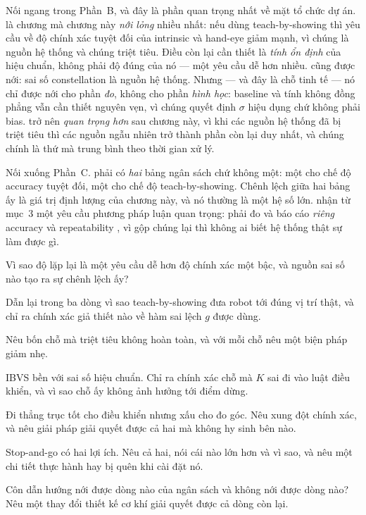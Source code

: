 \documentclass[../../marker.tex]{subfiles}
\begin{document}
Nối ngang trong Phần~B, và đây là phần quan trọng nhất về mặt tổ chức dự án.  là chương mà chương này \emph{nới lỏng} nhiều nhất: nếu dùng teach-by-showing thì yêu cầu về độ chính xác tuyệt đối của intrinsic và hand-eye giảm mạnh, vì chúng là nguồn hệ thống và chúng triệt tiêu. Điều còn lại cần thiết là \emph{tính ổn định} của hiệu chuẩn, không phải độ đúng của nó --- một yêu cầu dễ hơn nhiều.  cũng được nới: sai số constellation là nguồn hệ thống. Nhưng --- và đây là chỗ tinh tế --- nó chỉ được nới cho phần \emph{đo}, không cho phần \emph{hình học}: baseline và tính không đồng phẳng vẫn cần thiết nguyên vẹn, vì chúng quyết định \(\sigma\) hiệu dụng chứ không phải bias.  trở nên \emph{quan trọng hơn} sau chương này, vì khi các nguồn hệ thống đã bị triệt tiêu thì các nguồn ngẫu nhiên trở thành phần còn lại duy nhất, và chúng chính là thứ mà trung bình theo thời gian xử lý.

Nối xuống Phần~C.  phải có \emph{hai} bảng ngân sách chứ không một: một cho chế độ accuracy tuyệt đối, một cho chế độ teach-by-showing. Chênh lệch giữa hai bảng ấy là giá trị định lượng của chương này, và nó thường là một hệ số lớn.  nhận từ mục~3 một yêu cầu phương pháp luận quan trọng: phải đo và báo cáo \emph{riêng} accuracy và repeatability \cite{iso9283}, vì gộp chúng lại thì không ai biết hệ thống thật sự làm được gì.

\begin{tukiem}
\item Vì sao độ lặp lại là một yêu cầu dễ hơn độ chính xác một bậc, và nguồn sai số nào tạo ra sự chênh lệch ấy?
\item Dẫn lại trong ba dòng vì sao teach-by-showing đưa robot tới đúng vị trí thật, và chỉ ra chính xác giả thiết nào về hàm sai lệch \(g\) được dùng.
\item Nêu bốn chỗ mà triệt tiêu không hoàn toàn, và với mỗi chỗ nêu một biện pháp giảm nhẹ.
\item IBVS bền với sai số hiệu chuẩn. Chỉ ra chính xác chỗ mà \(K\) sai đi vào luật điều khiển, và vì sao chỗ ấy không ảnh hưởng tới điểm dừng.
\item Đi thẳng trục tốt cho điều khiển nhưng xấu cho đo góc. Nêu xung đột chính xác, và nêu giải pháp giải quyết được cả hai mà không hy sinh bên nào.
\item Stop-and-go có hai lợi ích. Nêu cả hai, nói cái nào lớn hơn và vì sao, và nêu một chi tiết thực hành hay bị quên khi cài đặt nó.
\item Côn dẫn hướng nới được dòng nào của ngân sách và không nới được dòng nào? Nêu một thay đổi thiết kế cơ khí giải quyết được cả dòng còn lại.
\end{tukiem}
\ifSubfilesClassLoaded{\printbibliography[title={Nguồn}]}{}
\end{document}
